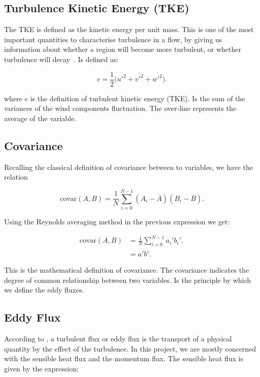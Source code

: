 \subsection{Turbulence Kinetic Energy (TKE)}
The TKE is defined as the kinetic energy per unit mass. This is one of the most important quantities to characterise turbulence in a flow, by giving us information about whether a region will become more turbulent, or whether turbulence will decay~\citep{stull2012introduction}.  Is defined as:

\begin{equation}
    e = \frac{1}{2} \big(\overline{u'^2} + \overline{v'^2} + \overline{w'^2}\big). 
    \label{eq:tke}
\end{equation}

\noindent where $e$ is the definition of turbulent kinetic energy (TKE). Is the sum of the variances of the wind components fluctuation. The over-line represents the average of the variable. 

\subsection{Covariance}

Recalling the classical definition of covariance between to variables, we have the relation 

\begin{equation}
    \text{covar}(A,B) = \frac{1}{N}\sum_{i=0}^{N-1} (A_i - \overline{A})(B_i - \overline{B}).
\end{equation}

\noindent Using the Reynolds averaging method in the previous expression we get:

\begin{subequations}
\begin{align}
    \text{covar}(A,B) &= \frac{1}{N}\sum_{i=0}^{N-1} a_i' b_i', \\
    &= \overline{a'b'}.
\end{align}
\end{subequations}

\noindent This is the mathematical definition of covariance. The covariance indicates the degree of common relationship between two variables. Is the principle by which we define the eddy fluxes.

\subsection{Eddy Flux}
According to \cite{stull2012introduction}, a turbulent flux or eddy flux is the transport of a physical quantity by the effect of the turbulence. In this project, we are mostly concerned with the sensible heat flux and the momentum flux. The sensible heat flux is given by the expression:

